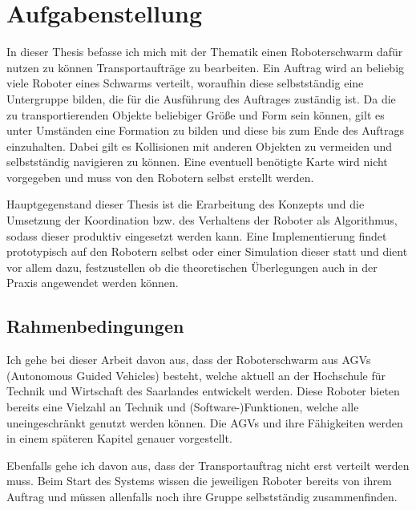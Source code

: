 \section{Aufgabenstellung}
In dieser Thesis befasse ich mich mit der Thematik einen Roboterschwarm dafür nutzen zu können Transportaufträge zu bearbeiten. Ein Auftrag wird an beliebig viele Roboter eines Schwarms verteilt, woraufhin diese selbstständig eine Untergruppe bilden, die für die Ausführung des Auftrages zuständig ist. Da die zu transportierenden Objekte beliebiger Größe und Form sein können, gilt es unter Umständen eine Formation zu bilden und diese bis zum Ende des Auftrags einzuhalten. Dabei gilt es Kollisionen mit anderen Objekten zu vermeiden und selbstständig navigieren zu können. Eine eventuell benötigte Karte wird nicht vorgegeben und muss von den Robotern selbst erstellt werden.

Hauptgegenstand dieser Thesis ist die Erarbeitung des Konzepts und die Umsetzung der Koordination bzw. des Verhaltens der Roboter als Algorithmus, sodass dieser produktiv eingesetzt werden kann. Eine Implementierung findet prototypisch auf den Robotern selbst oder einer Simulation dieser statt und dient vor allem dazu, festzustellen ob die theoretischen Überlegungen auch in der Praxis angewendet werden können.

\subsection*{Rahmenbedingungen}
Ich gehe bei dieser Arbeit davon aus, dass der Roboterschwarm aus AGVs (Autonomous Guided Vehicles) besteht, welche aktuell an der Hochschule für Technik und Wirtschaft des Saarlandes entwickelt werden. Diese Roboter bieten bereits eine Vielzahl an Technik und (Software-)Funktionen, welche alle uneingeschränkt genutzt werden können. Die AGVs und ihre Fähigkeiten werden in einem späteren Kapitel genauer vorgestellt. %

Ebenfalls gehe ich davon aus, dass der Transportauftrag nicht erst verteilt werden muss. Beim Start des Systems wissen die jeweiligen Roboter bereits von ihrem Auftrag und müssen allenfalls noch ihre Gruppe selbstständig zusammenfinden.
